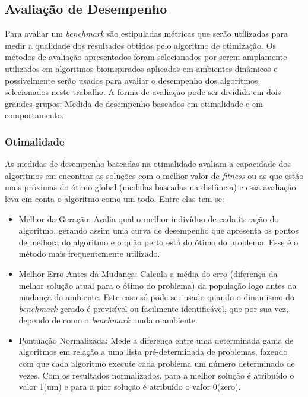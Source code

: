 \subsection{Avaliação de Desempenho}
\label{sec:perfermance_measures}

Para avaliar um \textit{benchmark} são estipuladas métricas que serão utilizadas para medir a qualidade dos resultados obtidos pelo algoritmo de otimização. Os métodos de avaliação apresentados foram selecionados por serem amplamente utilizados em algoritmos bioinspirados aplicados em ambientes dinâmicos e possivelmente serão usados para avaliar o desempenho dos algoritmos selecionados neste trabalho.
A forma de avaliação pode ser dividida em dois grandes grupos: Medida de desempenho baseados em otimalidade e em comportamento.

\subsubsection{Otimalidade}
As medidas de desempenho baseadas na otimalidade avaliam a capacidade dos algoritmos em encontrar as soluções com o melhor valor de \textit{fitness} ou as que estão mais próximas do ótimo global (medidas baseadas na distância) e essa avaliação leva em conta o algoritmo como um todo. Entre elas tem-se:

\begin{itemize}
\item Melhor da Geração: Avalia qual o melhor indivíduo de cada iteração do algoritmo, gerando assim uma curva de desempenho que apresenta os pontos de melhora do algoritmo e o quão perto está do ótimo do problema. Esse é o método mais frequentemente utilizado.

\item Melhor Erro Antes da Mudança: Calcula a média do erro (diferença da melhor solução atual para o ótimo do problema) da população logo antes da mudança do ambiente. Este caso só pode ser usado quando o dinamismo do \textit{benchmark} gerado é previsível ou facilmente identificável, que por sua vez, dependo de como o \textit{benchmark} muda o ambiente.

\item Pontuação Normalizada: Mede a diferença entre uma determinada gama de algoritmos em relação a uma lista pré-determinada de problemas, fazendo com que cada algoritmo execute cada problema um número determinado de vezes. Com os resultados normalizados, para a melhor solução é atribuído o valor 1(um) e para a pior solução é atribuído o valor 0(zero).
\end{itemize}

